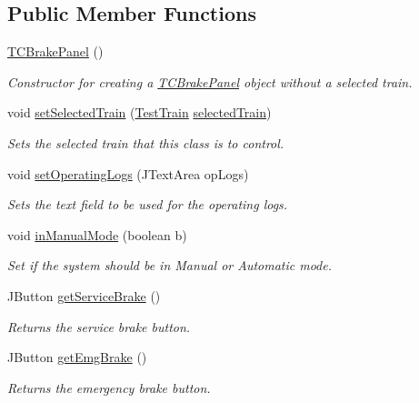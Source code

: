 \subsection*{Public Member Functions}
\begin{DoxyCompactItemize}
\item 
\hyperlink{classTrainControllerComps_1_1TCBrakePanel_a5940e47f6529fb96044ba90413906b30}{T\+C\+Brake\+Panel} ()
\begin{DoxyCompactList}\small\item\em Constructor for creating a \hyperlink{classTrainControllerComps_1_1TCBrakePanel}{T\+C\+Brake\+Panel} object without a selected train. \end{DoxyCompactList}\item 
void \hyperlink{classTrainControllerComps_1_1TCBrakePanel_a081a9013d44c3933e6acb9a7bd01135f}{set\+Selected\+Train} (\hyperlink{classTrainControllerComps_1_1TestTrain}{Test\+Train} \hyperlink{classTrainControllerComps_1_1TCBrakePanel_ac8f5bb4b6ea27c0d53b99945f9c68141}{selected\+Train})
\begin{DoxyCompactList}\small\item\em Sets the selected train that this class is to control. \end{DoxyCompactList}\item 
void \hyperlink{classTrainControllerComps_1_1TCBrakePanel_ac705fa5eeb5f291ccc8a5af7885fc7c6}{set\+Operating\+Logs} (J\+Text\+Area op\+Logs)
\begin{DoxyCompactList}\small\item\em Sets the text field to be used for the operating logs. \end{DoxyCompactList}\item 
void \hyperlink{classTrainControllerComps_1_1TCBrakePanel_a4ba678ac423a17477b5b15077c55cb7a}{in\+Manual\+Mode} (boolean b)
\begin{DoxyCompactList}\small\item\em Set if the system should be in Manual or Automatic mode. \end{DoxyCompactList}\item 
J\+Button \hyperlink{classTrainControllerComps_1_1TCBrakePanel_af33870de15eae5f27e4cfce85efda275}{get\+Service\+Brake} ()
\begin{DoxyCompactList}\small\item\em Returns the service brake button. \end{DoxyCompactList}\item 
J\+Button \hyperlink{classTrainControllerComps_1_1TCBrakePanel_a1e16cb37e8eecb4d6fc13fbb6f9aa09d}{get\+Emg\+Brake} ()
\begin{DoxyCompactList}\small\item\em Returns the emergency brake button. \end{DoxyCompactList}\end{DoxyCompactItemize}
